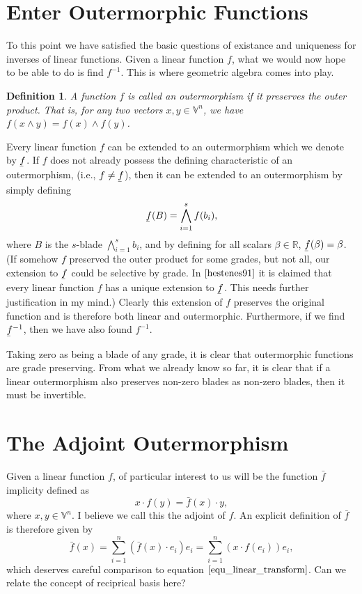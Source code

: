 \documentclass[12pt]{article}
\newcommand{\V}{\mathbb{V}}
\newcommand{\R}{\mathbb{R}}
\newcommand{\uf}{\underaccent{\bar}{f}}
\newcommand{\of}{\bar{f}}
\newtheorem{definition}{Definition}[section]
\begin{document}
\section{Enter Outermorphic Functions}

To this point we have satisfied the basic questions of existance and uniqueness
for inverses of linear functions.  Given a linear function $f$, what we
would now hope to be able to do is find $f^{-1}$.
This is where geometric algebra comes into play.
\begin{definition}
A function $f$ is called an outermorphism if it preserves
the outer product.  That is, for any two vectors $x,y\in\V^n$,
we have $f(x\wedge y)=f(x)\wedge f(y)$.
\end{definition}
Every linear function $f$ can be extended to an outermorphism which
we denote by $\uf$.  If $f$ does not already possess the defining
characteristic of an outermorphism, (i.e., $f\neq\uf$), then it can be
extended to an outermorphism by simply defining
\begin{equation*}
\uf(B) = \bigwedge_{i=1}^s f(b_i),
\end{equation*}
where $B$ is the $s$-blade $\bigwedge_{i=1}^s b_i$, and by defining for all
scalars $\beta\in\R$, $\uf(\beta)=\beta$.  (If somehow $f$ preserved the outer
product for some grades, but not all, our extension to $\uf$ could be selective
by grade.  In $\cite{hestenes91}$ it is claimed that every linear function $f$ has a unique
extension to $\uf$.  This needs further justification in my mind.)
Clearly this extension of $f$ preserves the
original function and is therefore both linear and outermorphic.  Furthermore, if
we find $\uf^{-1}$, then we have also found $f^{-1}$.

Taking zero as being a blade of any grade, it is clear that outermorphic functions are
grade preserving.  From what we already know so far, it is clear that if a linear outermorphism
also preserves non-zero blades as non-zero blades, then it must be invertible.

\section{The Adjoint Outermorphism}

Given a linear function $f$, of particular
interest to us will be the function $\of$ implicity defined as
\begin{equation*}
x\cdot f(y) = \of(x)\cdot y,
\end{equation*}
where $x,y\in\V^n$.  I believe we call this the adjoint of $f$.
An explicit definition of $\of$ is therefore given by
\begin{equation*}
\of(x) = \sum_{i=1}^n (\of(x)\cdot e_i)e_i = \sum_{i=1}^n (x\cdot f(e_i))e_i,
\end{equation*}
which deserves careful comparison to equation $\eqref{equ_linear_transform}$.
Can we relate the concept of reciprical basis here?
\end{document}

